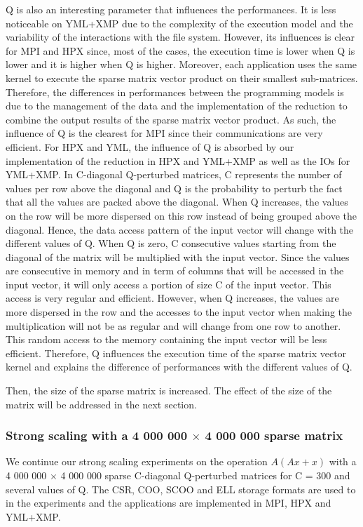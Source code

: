 Q is also an interesting parameter that influences the performances.
It is less noticeable on YML+XMP due to the complexity of the execution model and the variability of the interactions with the file system.
However, its influences is clear for MPI and HPX since, most of the cases, the execution time is lower when Q is lower and it is higher when Q is higher.
Moreover, each application uses the same kernel to execute the sparse matrix vector product on their smallest sub-matrices.
Therefore, the differences in performances between the programming models is due to the management of the data and the implementation of the reduction to combine the output results of the sparse matrix vector product.
As such, the influence of Q is the clearest for MPI since their communications are very efficient.
For HPX and YML, the influence of Q is absorbed by our implementation of the reduction in HPX and YML+XMP as well as the IOs for YML+XMP.
In C-diagonal Q-perturbed matrices, C represents the number of values per row above the diagonal and Q is the probability to perturb the fact that all the values are packed above the diagonal.
When Q increases, the values on the row will be more dispersed on this row instead of being grouped above the diagonal.
Hence, the data access pattern of the input vector will change with the different values of Q.
When Q is zero, C consecutive values starting from the diagonal of the matrix will be multiplied with the input vector.
Since the values are consecutive in memory and in term of columns that will be accessed in the input vector, it will only access a portion of size C of the input vector.
This access is very regular and efficient.
However, when Q increases, the values are more dispersed in the row and the accesses to the input vector when making the multiplication will not be as regular and will change from one row to another.
This random access to the memory containing the input vector will be less efficient.
Therefore, Q influences the execution time of the sparse matrix vector kernel and explains the difference of performances with the different values of Q.

Then, the size of the sparse matrix is increased.
The effect of the size of the matrix will be addressed in the next section.

\subsubsection{Strong scaling with a 4 000 000 $\times$ 4 000 000 sparse matrix}
We continue our strong scaling experiments on the operation $A(Ax+x)$ with a 4 000 000 $\times$ 4 000 000 sparse C-diagonal Q-perturbed matrices for C = 300 and several values of Q.
The CSR, COO, SCOO and ELL storage formats are used to in the experiments and the applications are implemented in MPI, HPX and YML+XMP.

